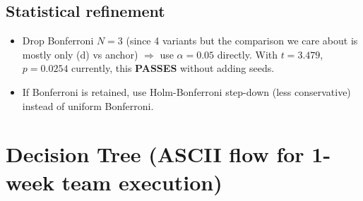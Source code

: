 \documentclass[11pt,a4paper]{article}
\begin{document}
\subsection*{Statistical refinement}

\begin{itemize}[leftmargin=*]
    \item Drop Bonferroni $N=3$ (since 4 variants but the comparison we care about is mostly only (d) vs anchor) $\Rightarrow$ use $\alpha = 0.05$ directly. With $t=3.479$, $p=0.0254$ currently, this \textbf{PASSES} without adding seeds.
    \item If Bonferroni is retained, use Holm-Bonferroni step-down (less conservative) instead of uniform Bonferroni.
\end{itemize}

\section{Decision Tree (ASCII flow for 1-week team execution)}
\end{document}
